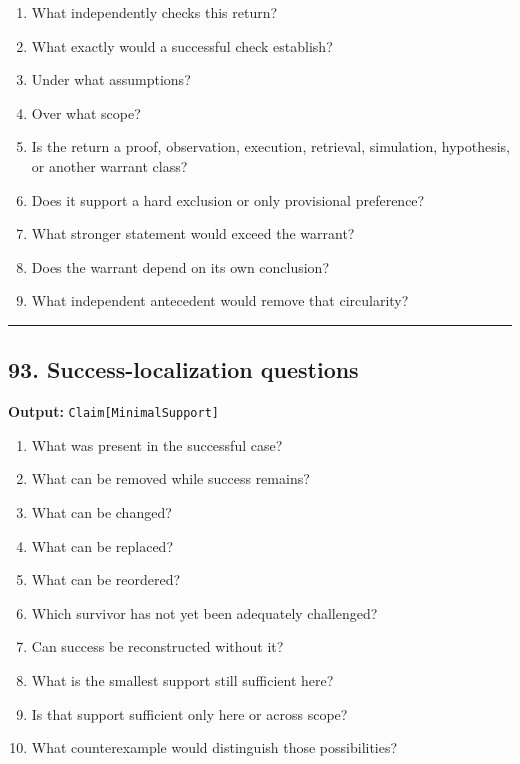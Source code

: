 \documentclass[
]{article}
\providecommand{\tightlist}{%
  \setlength{\itemsep}{0pt}\setlength{\parskip}{0pt}}
\begin{document}
\begin{enumerate}
\def\labelenumi{\arabic{enumi}.}
\tightlist
\item
  What independently checks this return?
\item
  What exactly would a successful check establish?
\item
  Under what assumptions?
\item
  Over what scope?
\item
  Is the return a proof, observation, execution, retrieval, simulation,
  hypothesis, or another warrant class?
\item
  Does it support a hard exclusion or only provisional preference?
\item
  What stronger statement would exceed the warrant?
\item
  Does the warrant depend on its own conclusion?
\item
  What independent antecedent would remove that circularity?
\end{enumerate}

\begin{center}\rule{0.5\linewidth}{0.5pt}\end{center}

\subsection{93. Success-localization
questions}\label{success-localization-questions}

\textbf{Output:} \texttt{Claim{[}MinimalSupport{]}}

\begin{enumerate}
\def\labelenumi{\arabic{enumi}.}
\tightlist
\item
  What was present in the successful case?
\item
  What can be removed while success remains?
\item
  What can be changed?
\item
  What can be replaced?
\item
  What can be reordered?
\item
  Which survivor has not yet been adequately challenged?
\item
  Can success be reconstructed without it?
\item
  What is the smallest support still sufficient here?
\item
  Is that support sufficient only here or across scope?
\item
  What counterexample would distinguish those possibilities?
\end{enumerate}
\end{document}
